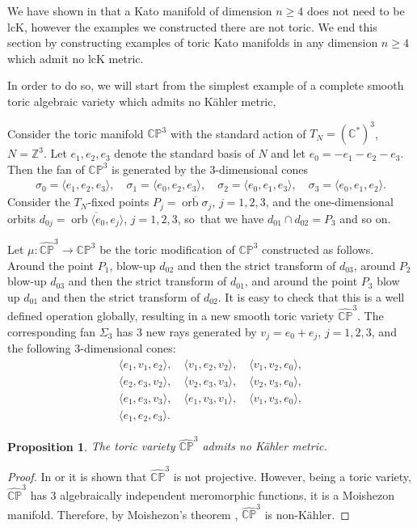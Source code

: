 \documentclass[JEP,XML,SOM,Unicode,NoFloatCountersInSection]{cedram}
\newtheorem{proposition}[theorem]{Proposition}
\theoremstyle{definition}
\let\ov\overline
\newcommand{\CC}{\mathbb{C}}
\newcommand{\PP}{\mathbb{P}}
\newcommand{\ZZ}{\mathbb{Z}}
\DeclareMathOperator{\orb}{orb}
\newcommand{\Ka}{Kähler\xspace}
\begin{document}
We have shown in \cite{iop} that a Kato manifold of dimension $n\geq 4$ does not need to be lcK, however the examples we constructed there are not toric. We end this section by constructing examples of toric Kato manifolds in any dimension $n\geq 4$ which admit no lcK metric.

In order to do so, we will start from the simplest example of a complete smooth toric algebraic variety which admits no \Ka metric, \cf \cite{oda2}

Consider the toric manifold $\CC\PP^3$ with the standard action of $T_{N}=(\CC^*)^3$, $N=\ZZ^3$. Let $e_1,e_2, e_3$ denote the standard basis of $N$ and let $e_0=-e_1-e_2-e_3$. Then the fan of $\CC\PP^3$ is generated by the $3$-dimensional cones
\begin{gather*}
\sigma_0=\langle e_1, e_2, e_3 \rangle, \quad \sigma_1=\langle e_0, e_2, e_3 \rangle, \quad \sigma_2=\langle e_0, e_1, e_3 \rangle, \quad \sigma_3=\langle e_0, e_1, e_2 \rangle.
\end{gather*}
Consider the $T_N$-fixed points $P_j=\ov{\orb \sigma_j}$, $j=1,2,3$, and the one-dimensional orbits $d_{0j}=\ov{\orb\langle e_0, e_j\rangle}$, $j=1,2,3$, so~that we have $d_{01}\cap d_{02}=P_3$ and so on.

Let $\mu:\hat{\CC\PP}^3\to \CC\PP^3$ be the toric modification of $\CC\PP^3$ constructed as follows. Around the point $P_1$, blow-up $d_{02}$ and then the strict transform of $d_{03}$, around $P_2$ blow-up $d_{03}$ and then the strict transform of $d_{01}$, and around the point $P_3$ blow up $d_{01}$ and then the strict transform of $d_{02}$. It is easy to check that this is a well defined operation globally, resulting in a new smooth toric variety $\hat{\CC\PP}^3$. The corresponding fan $\Sigma_3$ has $3$ new rays generated by $v_j=e_0+e_j$, $j=1,2,3$, and the following $3$-dimensional cones:
\begin{gather*}
\langle e_1, v_1, e_2 \rangle, \quad \langle v_1, e_2, v_2 \rangle,\quad \langle v_1,v_2,e_0 \rangle,\\
\langle e_2, e_3, v_2 \rangle, \quad \langle v_2, e_3, v_3 \rangle, \quad \langle v_2, v_3, e_0 \rangle,\\
\langle e_1, e_3, v_3 \rangle, \quad \langle e_1, v_3, v_1 \rangle, \quad \langle v_1,v_3, e_0 \rangle,\\
\langle e_1, e_2, e_3 \rangle.
\end{gather*}

\begin{proposition}\label{nonproj3} The toric variety $\hat{\CC\PP}^3$ admits no \Ka metric.
\end{proposition}
\begin{proof}
In \cite[Prop.\,9.4]{oda} or \cite[Ex.\,on p.\,84]{oda2} it is shown that $\hat{\CC\PP}^3$ is not projective. However, being a toric variety, $\hat{\CC\PP}^3$ has $3$ algebraically independent meromorphic functions, \ie it is a Moishezon manifold. Therefore, by Moishezon's theorem \cite[Chap.\,I, Th.\,11]{moi}, $\hat{\CC\PP}^3$ is non-\Ka.
\end{proof}
\end{document}
